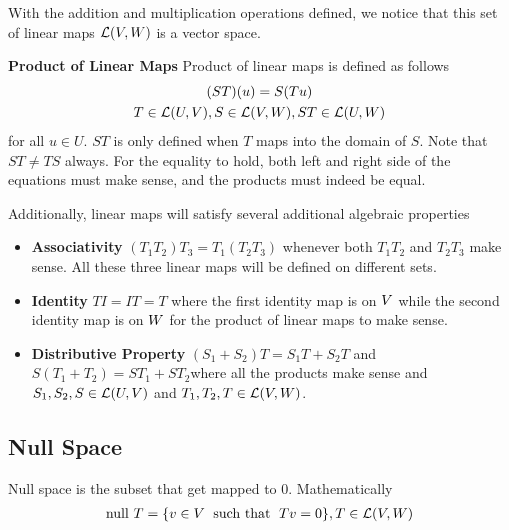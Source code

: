 \documentclass[../../linear_algebra.tex]{subfiles}
\begin{document}
With the addition and multiplication operations defined, we notice that this set of linear maps $\mathcal{L}(V, W)$ is a vector space.\newline

\textbf{Product of Linear Maps}\newline
Product of linear maps is defined as follows
\begin{gather*}
    (ST)(u) = S(Tu)\\
    T \in \mathcal{L}(U, V), S \in \mathcal{L}(V, W), ST \in \mathcal{L}(U, W)
\end{gather*}
for all $u \in U$. $ST$ is only defined when $T$ maps into the domain of $S$. Note that $ST \neq TS$ always. For the equality to hold, both left and right side of the equations must make sense, and the products must indeed be equal.\newline

Additionally, linear maps will satisfy several additional algebraic properties
\begin{itemize}
    \item \textbf{Associativity}\newline
    $(T_{1}T_{2})T_{3} = T_{1}(T_{2}T_{3})$ whenever both $T_{1}T_{2}$ and $T_{2}T_{3}$ make sense. All these three linear maps will be defined on different sets.
    \item \textbf{Identity}\newline
    $TI = IT = T$ where the first identity map is on $V$ while the second identity map is on $W$ for the product of linear maps to make sense.
    \item \textbf{Distributive Property}\newline
    $(S_{1} + S_{2})T = S_{1}T + S_{2}T$ and $S(T_{1} + T_{2}) = ST_{1} + ST_{2}$\newline where all the products make sense and $S_{1}, S_{2}, S \in \mathcal{L}(U, V)$ and $T_{1}, T_{2}, T \in \mathcal{L}(V, W)$.
\end{itemize}

\subsection{Null Space}
Null space is the subset that get mapped to 0. Mathematically
\begin{gather*}
    \text{null }T = \{ v \in V \; \text{ such that } \; Tv = 0 \}, T \in \mathcal{L}(V, W)
\end{gather*}
\end{document}

